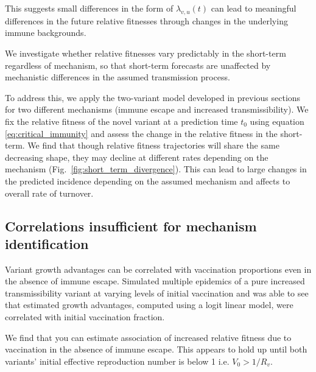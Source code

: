 \documentclass[12pt,oneside,letterpaper]{article}
\begin{document}
This suggests small differences in the form of $\lambda_{v,u}(t)$ can lead to meaningful differences in the future relative fitnesses through changes in the underlying immune backgrounds.

We investigate whether relative fitnesses vary predictably in the short-term regardless of mechanism, so that short-term forecasts are unaffected by mechanistic differences in the assumed transmission process.

To address this, we apply the two-variant model developed in previous sections for two different mechanisms (immune escape and increased transmissibility).
We fix the relative fitness of the novel variant at a prediction time $t_{0}$ using equation \ref{eq:critical_immunity} and assess the change in the relative fitness in the short-term.
We find that though relative fitness trajectories will share the same decreasing shape, they may decline at different rates depending on the mechanism (Fig.~\ref{fig:short_term_divergence}).
This can lead to large changes in the predicted incidence depending on the assumed mechanism and affects to overall rate of turnover.

\subsection*{Correlations insufficient for mechanism identification}

Variant growth advantages can be correlated with vaccination proportions even in the absence of immune escape.
Simulated multiple epidemics of a pure increased transmissibility variant at varying levels of initial vaccination and was able to see that estimated growth advantages, computed using a logit linear model, were correlated with initial vaccination fraction.

We find that you can estimate association of increased relative fitness due to vaccination in the absence of immune escape.
This appears to hold up until both variants' initial effective reproduction number is below 1 i.e. $V_{0} > 1 / R_{v}$.
\end{document}
